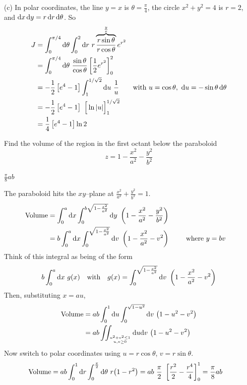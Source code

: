 \begin{solution}
(c) In polar coordinates, the line $y=x$ is $\theta=\frac{\pi}{4}$,
the circle $x^2+y^2=4$ is $r=2$, and 
$\mathrm{d}x\,\mathrm{d}y=r\,\mathrm{d}r\,\mathrm{d}\theta$. So
\begin{align*}
J&=\int_0^{\pi/4}\dee{\theta}\int_0^2\dee{r}\ r
         \overbrace{\frac{r\sin\theta}{r\cos\theta}}^{\frac{y}{x}}e^{r^2} \\
 &=\int_0^{\pi/4}\dee{\theta}\ \frac{\sin\theta}{\cos\theta}
           \left[\frac{1}{2} e^{r^2}\right]_0^2 \\
 &=-\frac{1}{2}\left[e^4-1\right] \int_1^{1/\sqrt{2}}\dee{u}\ \frac{1}{u}
   \qquad\text{with }u=\cos\theta,\ \dee{u}=-\sin\theta\,\dee{\theta} \\
 &=-\frac{1}{2}\left[e^4-1\right]\ \Big[\ln|u|\Big]_1^{1/\sqrt{2}} \\
 &= \frac{1}{4}\left[e^4-1\right]\ln 2
\end{align*}
\end{solution}

\begin{question}
Find the volume of the region in the first octant below the 
paraboloid
$$
z=1-\frac{x^2}{a^2}-\frac{y^2}{b^2}
$$
\end{question}

%

\begin{answer}
$\frac{\pi}{8}ab$
\end{answer}

\begin{solution}
The paraboloid hits the $xy$--plane at $\frac{x^2}{a^2}
+\frac{y^2}{b^2}=1$. 
\begin{align*}
\text{Volume}
&=\int_0^a \dee{x}\int_0^{b\sqrt{1-{x^2\over a^2}}} \dee{y}\ 
\left(1-\frac{x^2}{a^2}-\frac{y^2}{b^2}\right) \cr
&=b\int_0^a \dee{x}\int_0^{\sqrt{1-{x^2\over a^2}}} \dee{v}\ 
\left(1-\frac{x^2}{a^2}-v^2\right) \qquad\text{ where $y=bv$}\cr
\end{align*}
Think of this integral as being of the form 
\begin{equation*}
\displaystyle b\int_0^a \dee{x}\ g(x)\quad \text{with}\quad
\displaystyle g(x)=\int_0^{\sqrt{1-{x^2\over a^2}}} \dee{v}\ 
                               \left(1-\frac{x^2}{a^2}-v^2\right)
\end{equation*}
Then, substituting $x=au$,
\begin{align*}
\text{Volume}
&=ab\int_0^1 \dee{u}\int_0^{\sqrt{1-u^2}} \dee{v}\ \big(1-u^2-v^2\big) \\
&=ab\dblInt_{u^2+v^2\le 1\atop u,v\ge 0} \dee{u}  \dee{v}\ 
\big(1-u^2-v^2\big) 
\end{align*}
Now switch to polar coordinates using $u=r\cos\theta$, $v=r\sin\theta$.
\begin{align*}
\text{Volume}
&=ab\int_0^1 \dee{r}\int_0^{\pi\over 2} \dee{\theta}\ r\big(1-r^2\big)
=ab\ \frac{\pi}{2}\ \left[\frac{r^2}{2}-\frac{r^4}{4}\right]_0^1
=\frac{\pi}{8}ab
\end{align*}
\end{solution}

